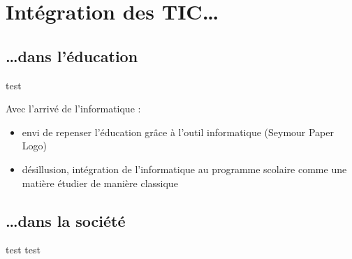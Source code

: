 \section{Intégration des TIC\ldots}

\subsection{\ldots dans l'éducation}

\begin{frame}{test}

Avec l'arrivé de l'informatique :
\begin{itemize}
\item envi de repenser l'éducation grâce à l'outil informatique (Seymour Paper Logo)
\item désillusion, intégration de l'informatique au programme scolaire comme une matière étudier de manière classique
\end{itemize}
\end{frame}

\subsection{\ldots dans la société}

\begin{frame}{test}
test
\end{frame}
